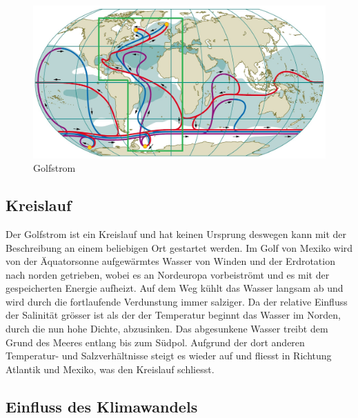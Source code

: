 \begin{figure}
	\includegraphics[width=12cm]{thermohalin/Bilder/Deep-Ocean-Currents2.jpg}
	\centering
	\caption{Golfstrom\label{thermohalin:Deep-Ocean-Currents}}
\end{figure}



\subsection{Kreislauf}

Der Golfstrom ist ein Kreislauf und hat keinen Ursprung deswegen kann mit der Beschreibung an einem beliebigen Ort gestartet werden. Im Golf von Mexiko wird von der Äquatorsonne aufgewärmtes Wasser von Winden und der Erdrotation nach norden getrieben, wobei es an Nordeuropa vorbeiströmt und es mit der gespeicherten Energie aufheizt.
Auf dem Weg kühlt das Wasser langsam ab und wird durch die fortlaufende Verdunstung immer salziger. Da der relative Einfluss der Salinität grösser ist als der der Temperatur beginnt das Wasser im Norden, durch die nun hohe Dichte, abzusinken. Das abgesunkene Wasser treibt dem Grund des Meeres entlang bis zum Südpol. Aufgrund der dort anderen Temperatur- und Salzverhältnisse steigt es wieder auf und fliesst in Richtung Atlantik und Mexiko, was den Kreislauf schliesst.

\subsection{Einfluss des Klimawandels}\label{thermohalin:EinflussKlimawandel}

